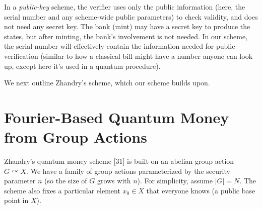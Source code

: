 \documentclass[11pt]{article}
\theoremstyle{definition}
\begin{document}
In a \emph{public-key} scheme, the verifier uses only the public information (here, the serial number and any scheme-wide public parameters) to check validity, and does not need any secret key. The bank (mint) may have a secret key to produce the states, but after minting, the bank’s involvement is not needed. In our scheme, the serial number will effectively contain the information needed for public verification (similar to how a classical bill might have a number anyone can look up, except here it’s used in a quantum procedure).

We next outline Zhandry’s scheme, which our scheme builds upon.

\section{Fourier-Based Quantum Money from Group Actions}
Zhandry’s quantum money scheme [31] is built on an abelian group action $G \curvearrowright X$. We have a family of group actions parameterized by the security parameter $n$ (so the size of $G$ grows with $n$). For simplicity, assume $|G| = N$. The scheme also fixes a particular element $x_0 \in X$ that everyone knows (a public base point in $X$).
\end{document}
